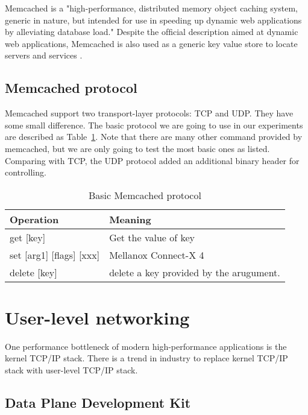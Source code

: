 \documentclass[bsc,frontabs,twoside,singlespacing,parskip,deptreport]{infthesis}     %
\begin{document}
Memcached is a "high-performance, distributed memory object caching system, generic in nature, but intended for use in speeding up dynamic web applications by alleviating database load." Despite the ofﬁcial description aimed at dynamic web applications, Memcached is also used as a generic key value store to locate servers and services .

\subsection{Memcached protocol}

Memcached support two  transport-layer protocols: TCP and UDP. They have some small difference. The basic protocol we are going to use in our experiments are described as Table~\ref{tab:mem_proto}. Note that there are many other command provided by memcached, but we are only going to test the most basic ones as listed. Comparing with TCP, the UDP protocol added an additional binary header for controlling. 


\begin{table}
\begin{tabular}{ |p{6cm}||p{6cm}|  }

 \hline
 Operation & Meaning \\
 \hline
get [key]  & Get the value of key \\
 \hline
set [arg1] [flags] [xxx] & Mellanox Connect-X 4 \\
 \hline
delete [key] & delete a key provided by the arugument. \\
 \hline
 
\end{tabular}
\caption{Basic Memcached protocol}
\label{tab:mem_proto}


\end{table}






\section{User-level networking}
One performance bottleneck of modern high-performance applications is the kernel TCP/IP stack. There is a trend in industry to replace kernel TCP/IP stack with user-level TCP/IP stack.



\subsection{Data Plane Development Kit}
\end{document}
